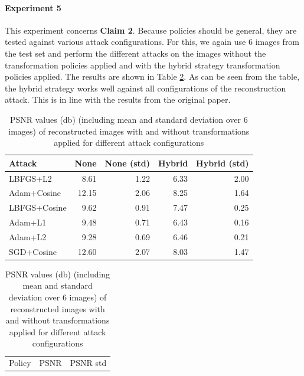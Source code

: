 \paragraph{Experiment 5} This experiment concerns \textbf{Claim 2}. Because policies should be general, they are tested against various attack configurations. For this, we again use $6$ images from the test set and perform the different attacks on the images without the transformation policies applied and with the hybrid strategy transformation policies applied. The results are shown in Table \ref{tab:2}. As can be seen from the table, the hybrid strategy works well against all configurations of the reconstruction attack. This is in line with the results from the original paper.

\begin{table}[htb!]
    \begin{minipage}{.6\linewidth}
    \centering
    \begin{tabular}{lrrrr}
        \hline
         Attack       &   None &   None  (std) &   Hybrid &   Hybrid  (std) \\
        \hline
         LBFGS+L2     &               8.61 &             1.22 &                 6.33 &                2.00 \\
         Adam+Cosine  &              12.15 &             2.06 &                 8.25 &                1.64 \\
         LBFGS+Cosine &               9.62 &             0.91 &                 7.47 &                0.25 \\
         Adam+L1      &               9.48 &             0.71 &                 6.43 &                0.16 \\
         Adam+L2      &               9.28 &             0.69 &                 6.46 &                0.21 \\
         SGD+Cosine   &              12.60 &             2.07 &                 8.03 &                1.47 \\
        \hline
        \end{tabular}
    \caption{PSNR values (db) (including mean and standard deviation over $6$ images) of reconstructed images with and without transformations applied for different attack configurations}
    \label{tab:2}
    \end{minipage}
    \hfill
    \begin{minipage}{.35\linewidth}
    \centering
        \begin{tabular}{lrr}
            \hline
             Policy   &   PSNR &   PSNR std \\

\end{tabular}
\end{minipage}
\end{table}
